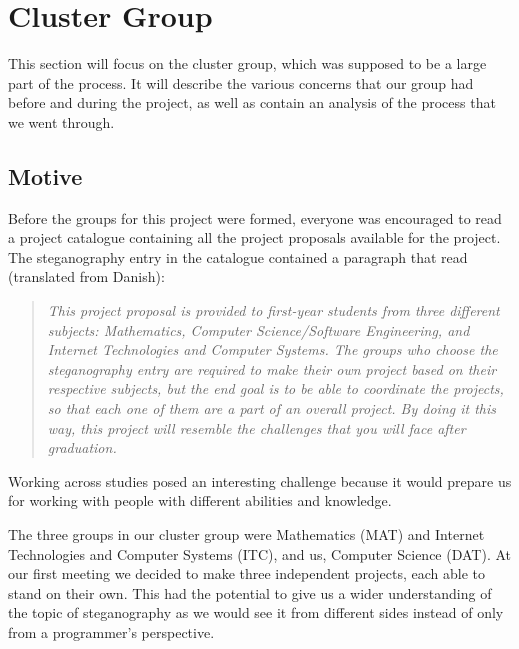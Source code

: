 \section{Cluster Group}
This section will focus on the cluster group, which was supposed to be a large part of the process. It will describe the various concerns that our group had before and during the project, as well as contain an analysis of the process that we went through. 

\subsection*{Motive}
Before the groups for this project were formed, everyone was encouraged to read a project catalogue containing all the project proposals available for the project.
The steganography entry in the catalogue contained a paragraph that read (translated from Danish):
\begin{quote}\textit{This project proposal is provided to first-year students from three different subjects: Mathematics, Computer Science/Software Engineering, and Internet Technologies and Computer Systems. The groups who choose the steganography entry are required to make their own project based on their respective subjects, but the end goal is to be able to coordinate the projects, so that each one of them are a part of an overall project. By doing it this way, this project will resemble the challenges that you will face after graduation.}\end{quote}

Working across studies posed an interesting challenge because it would prepare us for working with people with different abilities and knowledge.

The three groups in our cluster group were Mathematics (MAT) and Internet Technologies and Computer Systems (ITC), and us, Computer Science (DAT). 
At our first meeting we decided to make three independent projects, each able to stand on their own. 
This had the potential to give us a wider understanding of the topic of steganography as we would see it from different sides instead of only from a programmer's perspective.